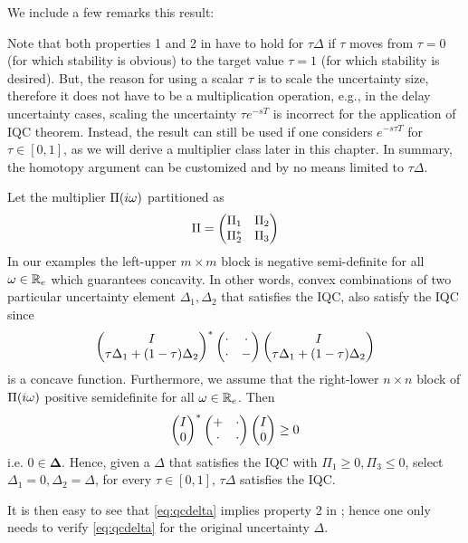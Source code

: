 We include a few remarks this result: 
\begin{rem}\label{remiqc1}
Note that both properties 1 and 2 in  have to hold for $\tau\Delta$ 
if $\tau$ moves from $\tau=0$ (for which stability is obvious) to the target value $\tau=1$ 
(for which stability is desired). But, the reason for using a scalar $\tau$ is to scale the uncertainty
size, therefore it does not have to be a multiplication operation, e.g., in the delay uncertainty cases,
scaling the uncertainty $\tau e^{-sT}$ is incorrect for the application of IQC theorem. Instead, 
the result can still be used if one considers $e^{-s\tau T}$ for $\tau\in[0,1]$, as we will derive
a multiplier class later in this chapter. In summary, the homotopy 
argument can be customized and  by no means limited to $\tau\Delta$. 

Let the multiplier $\Pi(i\omega)$ partitioned as
\begin{equation}
\Pi = \begin{pmatrix}\Pi_1&\Pi_2\\\Pi_2^* &\Pi_3\end{pmatrix}
\label{eq:Pipart}
\end{equation}
In our examples the left-upper $m\times m$ block is negative semi-definite for all $\omega\in\mathbb{R}_e$
which guarantees concavity. In other words, convex combinations of two particular uncertainty element 
$\Delta_1, \Delta_2$ that satisfies the IQC, also satisfy the IQC since
\[
\begin{pmatrix}I\\ \tau\Delta_1+(1-\tau)\Delta_2\end{pmatrix}^*\begin{pmatrix}\cdot &\cdot\\\cdot &-\end{pmatrix}\begin{pmatrix}I\\ \tau\Delta_1+(1-\tau)\Delta_2\end{pmatrix}
\]
is a concave function. Furthermore, we assume that the right-lower $n\times n$ block of $\Pi(i\omega)$ 
positive semidefinite for all $\omega\in\mathbb{R}_e$. Then
\[
\begin{pmatrix}I\\ 0\end{pmatrix}^*\begin{pmatrix}+ &\cdot\\\cdot &\cdot\end{pmatrix}\begin{pmatrix}I\\0\end{pmatrix} \geq 0
\]
i.e. $0\in\bm{\Delta}$.
Hence, given a $\Delta$ that satisfies the IQC with $\Pi_1 \geq 0, \Pi_3\leq 0$, select $\Delta_1 = 0, \Delta_2 = \Delta$, 
for every $\tau\in [0,1]$, $\tau\Delta$ satisfies the IQC. 

It is then easy to see that \eqref{eq:qcdelta} implies property 2 in ; 
hence one only needs to verify \eqref{eq:qcdelta} for the original uncertainty $\Delta$.
\end{rem}

